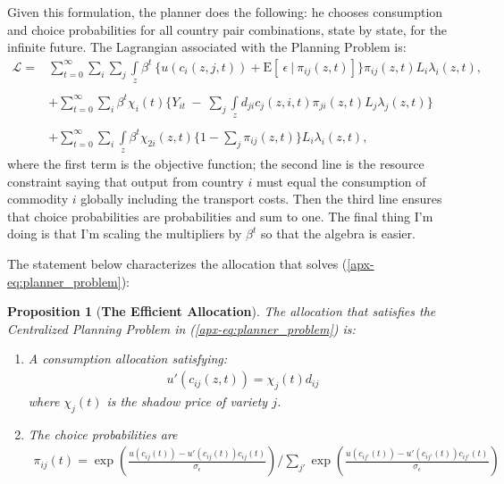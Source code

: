 \documentclass[12pt,pdftex]{article}
\newtheorem{prp}{Proposition}
\begin{document}
\begin{onehalfspacing}
Given this formulation, the planner does the following: he chooses consumption and choice probabilities for all country pair combinations, state by state, for the infinite future. The Lagrangian associated with the Planning Problem is:
\begin{align}
\mathcal{L}  = & \sum_{t=0}^{\infty}   \sum_{i} \sum_{j} \int\limits_{z}  \beta^{t} \  \bigg \{  u(c_{i}(z, j, t) ) + \mathrm{E}[ \ \epsilon \ | \ \pi_{ij}(z,t) ] \bigg \}\pi_{ij}(z,t) L_{i} \lambda_{i}(z, t), \label{apx-eq:planner_problem} \\
\nonumber \\
&+ \sum_{t=0}^{\infty} \sum_{i} \beta^{t} \chi_{i}(t) \bigg \{ Y_{it} \  - \ \sum_{j} \int\limits_{z}  d_{ji} c_{j}(z, i, t) \pi_{ji}(z,t) L_{j}\lambda_{j}(z, t) \bigg \} \nonumber \\
\nonumber \\
&+ \sum_{t=0}^{\infty} \sum_{i} \int\limits_{z}  \beta^{t} \chi_{2i}(z,t) \bigg \{1 - \sum_{j}\pi_{ij}(z,t) \bigg \} L_{i} \lambda_{i}(z, t), \nonumber
\end{align}
where the first term is the objective function; the second line is the resource constraint saying that output from country $i$ must equal the consumption of commodity $i$ globally including the transport costs. Then the third line ensures that choice probabilities are probabilities and sum to one. The final thing I'm doing is that I'm scaling the multipliers by $\beta^t$ so that the algebra is easier.

The statement below characterizes the allocation that solves (\ref{apx-eq:planner_problem}):
\begin{prp}[\textbf{The Efficient Allocation}]\label{apx-prp:efficient-allocation} The allocation that satisfies the Centralized Planning Problem in (\ref{apx-eq:planner_problem}) is:
\begin{enumerate}
\item A consumption allocation satisfying:
\begin{align}
 u'(c_{ij}(z,t) ) = \chi_{j}(t) d_{ij}
\end{align}
where $\chi_{j}(t)$ is the shadow price of variety $j$.
\item The choice probabilities are
\begin{align}
\pi_{ij}(t) =\exp \left( \frac{u(c_{ij}(t)) - u'(c_{ij}(t))c_{ij}(t)}{\sigma_{\epsilon}}\right) \bigg / \sum_{j'}\exp \left( \frac{u(c_{ij'}(t)) - u'(c_{ij'}(t))c_{ij'}(t)}{\sigma_{\epsilon}} \right)
\label{apx-eq:planner-choice-prob}
\end{align}
\end{enumerate}
\end{prp}


\end{onehalfspacing}
\end{document}
